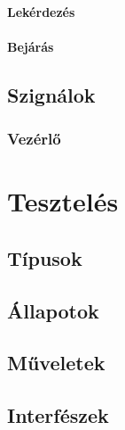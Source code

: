 \paragraph{Lekérdezés}

\paragraph{Bejárás}

\subsection{Szignálok}

\subsubsection{Vezérlő}

\section{Tesztelés}

\subsection{Típusok}
\subsection{Állapotok}
\subsection{Műveletek}
\subsection{Interfészek}
